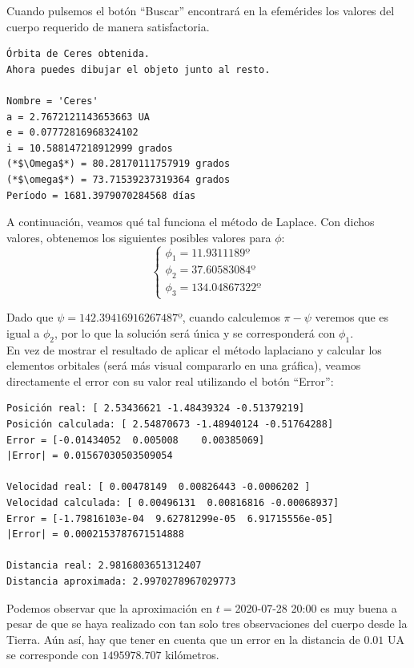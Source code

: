 Cuando pulsemos el botón ``Buscar'' encontrará en la efemérides los valores del cuerpo requerido de manera satisfactoria.
\begin{lstlisting}[style=Console]
Órbita de Ceres obtenida.
Ahora puedes dibujar el objeto junto al resto.

Nombre = 'Ceres'
a = 2.7672121143653663 UA
e = 0.07772816968324102
i = 10.588147218912999 grados
(*$\Omega$*) = 80.28170111757919 grados
(*$\omega$*) = 73.71539237319364 grados
Período = 1681.3979070284568 días
\end{lstlisting}

A continuación, veamos qué tal funciona el método de Laplace. Con dichos valores, obtenemos los siguientes posibles valores para $\phi$:
\[
\left\{
\begin{array}{l}
\phi_1=11.9311189º\\
\phi_2=37.60583084º\\
\phi_3=134.04867322º
\end{array}
\right.
\]

Dado que $\psi=142.39416916267487º$, cuando calculemos $\pi-\psi$ veremos que es igual a $\phi_2$, por lo que la solución será única y se corresponderá con $\phi_1$.\\

En vez de mostrar el resultado de aplicar el método laplaciano y calcular los elementos orbitales (será más visual compararlo en una gráfica), veamos directamente el error con su valor real utilizando el botón ``Error'':
\begin{lstlisting}[style=Console]
Posición real: [ 2.53436621 -1.48439324 -0.51379219]
Posición calculada: [ 2.54870673 -1.48940124 -0.51764288]
Error = [-0.01434052  0.005008    0.00385069]
|Error| = 0.01567030503509054

Velocidad real: [ 0.00478149  0.00826443 -0.0006202 ]
Velocidad calculada: [ 0.00496131  0.00816816 -0.00068937]
Error = [-1.79816103e-04  9.62781299e-05  6.91715556e-05]
|Error| = 0.0002153787671514888

Distancia real: 2.9816803651312407
Distancia aproximada: 2.9970278967029773
\end{lstlisting}

Podemos observar que la aproximación en $t=$2020-07-28 20:00 es muy buena a pesar de que se haya realizado con tan solo tres observaciones del cuerpo desde la Tierra. Aún así, hay que tener en cuenta que un error en la distancia de $0.01$ UA se corresponde con $1495978.707$ kilómetros.\\

